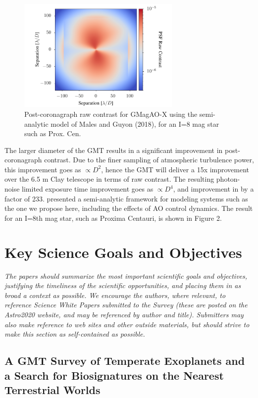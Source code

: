 \documentclass[12pt,preprint]{aastex}
\begin{document}
\begin{figure}
\centering
\vspace{-0.4in}
\includegraphics[width=3.1in]{figures/fig2.pdf}
\vspace{-0.2in}
\caption{ Post-coronagraph raw contrast for GMagAO-X using the semi-analytic model of Males and Guyon (2018), for an I=8 mag star such as Prox. Cen.   \label{fig:contrast} }
\end{figure}

The larger diameter of the GMT results in a significant improvement in post-coronagraph contrast. Due to the finer sampling of atmospheric turbulence power, this improvement goes as $\propto D^2$, hence the GMT will deliver a 15x improvement over the 6.5 m Clay telescope in terms of raw contrast.  The resulting photon-noise limited exposure time improvement goes as $\propto D^4$, and improvement in by a factor of 233.  \citet{2018JATIS...4a9001M} presented a semi-analytic framework for modeling systems such as the one we propose here, including the effects of AO control dynamics.  The result for an I=8th mag star, such as Proxima Centauri, is shown in Figure 2.

\section{Key Science Goals and Objectives}
\textit{The papers should summarize the most important
scientific goals and objectives, justifying the timeliness of the scientific opportunities, and
placing them in as broad a context as possible. We encourage the authors, where relevant, to
reference Science White Papers submitted to the Survey (these are posted on the Astro2020
website, and may be referenced by author and title). Submitters may also make reference to
web sites and other outside materials, but should strive to make this section as self-contained
as possible.}

\subsection{A GMT Survey of Temperate Exoplanets and a Search for Biosignatures on the Nearest Terrestrial Worlds}
\end{document}
